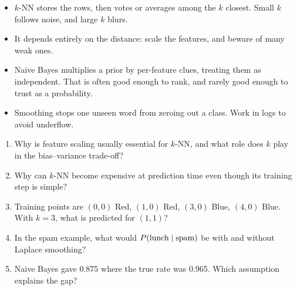 \begin{chapterrecap}
\begin{itemize}
  \item $k$-NN stores the rows, then votes or averages among the $k$ closest. Small $k$ follows noise, and large $k$ blurs.
  \item It depends entirely on the distance: scale the features, and beware of many weak ones.
  \item Naive Bayes multiplies a prior by per-feature clues, treating them as independent. That is often good enough to rank, and rarely good enough to trust as a probability.
  \item Smoothing stops one unseen word from zeroing out a class. Work in logs to avoid underflow.
\end{itemize}
\end{chapterrecap}

\begin{quickcheck}
\begin{enumerate}
  \item Why is feature scaling usually essential for $k$-NN, and what role does $k$ play in the bias--variance trade-off?
  \item Why can $k$-NN become expensive at prediction time even though its training step is simple?
  \item Training points are $(0,0)$ Red, $(1,0)$ Red, $(3,0)$ Blue, $(4,0)$ Blue. With $k=3$, what is predicted for $(1,1)$?
  \item In the spam example, what would $P(\text{lunch}\mathrel{|}\text{spam})$ be with and without Laplace smoothing?
  \item Naive Bayes gave 0.875 where the true rate was 0.965. Which assumption explains the gap?
\end{enumerate}
\end{quickcheck}

